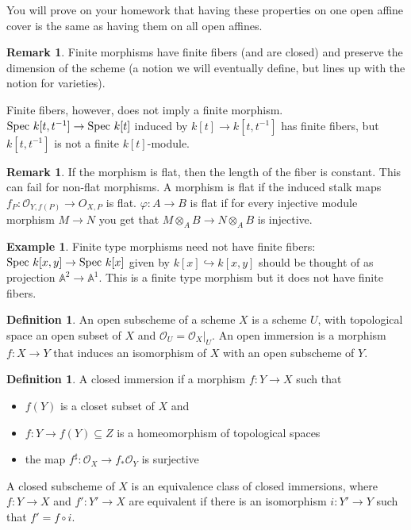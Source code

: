 \documentclass[10pt,reqno]{amsart}
\theoremstyle{definition}
\newtheorem{example}[theorem]{Example}
\newtheorem{definition}[theorem]{Definition}
\newtheorem{remark}[theorem]{Remark}
\theoremstyle{remark}
\numberwithin{equation}{section}
\numberwithin{theorem}{section}
\newcommand{\OO}{{\mathcal O}}
\newcommand{\spec}{\textup{Spec }}
\newcommand{\A}{{\mathbb A}}
\begin{document}
You will prove on your homework that having these properties on one open affine cover is the same as having them on all open affines.

\begin{remark} Finite morphisms have finite fibers (and are closed) and preserve the dimension of the scheme (a notion we will eventually define, but lines up with the notion for varieties).

Finite fibers, however, does not imply a finite morphism. $\spec k[t,t^{-1}] \to \spec k[t]$ induced by $k[t] \to k[t,t^{-1}]$ has finite fibers, but $k[t,t^{-1}]$ is not a finite $k[t]$-module.
\end{remark}

\begin{remark} If the morphism is flat, then the length of the fiber is constant. This can fail for non-flat morphisms. A morphism is flat if the induced stalk maps $f_P: \OO_{Y,f(P)} \to O_{X,P}$ is flat. $\varphi: A \to B$ is flat if for every injective module morphism $M \to N$ you get that $M \otimes_A B \to N \otimes_A B$ is injective.
\end{remark}

\begin{example} Finite type morphisms need not have finite fibers: $\spec k[x,y] \to \spec k[x]$ given by $k[x] \hookrightarrow k[x,y]$ should be thought of as projection $\A^2 \to \A^1$. This is a finite type morphism but it does not have finite fibers.
\end{example}

\begin{definition} An open subscheme of a scheme $X$ is a scheme $U$, with topological space an open subset of $X$ and $\OO_U = \OO_{X}|_U$. An open immersion is a morphism $f:X \to Y$ that induces an isomorphism of $X$ with an open subscheme of $Y$.
\end{definition}

\begin{definition} A closed immersion if a morphism $f: Y \to X$ such that
\begin{itemize}
\item $f(Y)$ is a closet subset of $X$ and
\item $f: Y \to f(Y) \subseteq Z$ is a homeomorphism of topological spaces
\item the map $f^{\sharp}: \OO_X \to f_* \OO_Y$ is surjective
\end{itemize}
\end{definition}
A closed subscheme of $X$ is an equivalence class of closed immersions, where $f: Y \to X$ and $f': Y' \to X$ are equivalent if there is an isomorphism $i: Y' \to Y$ such that $f' = f \circ i$.
\end{document}
